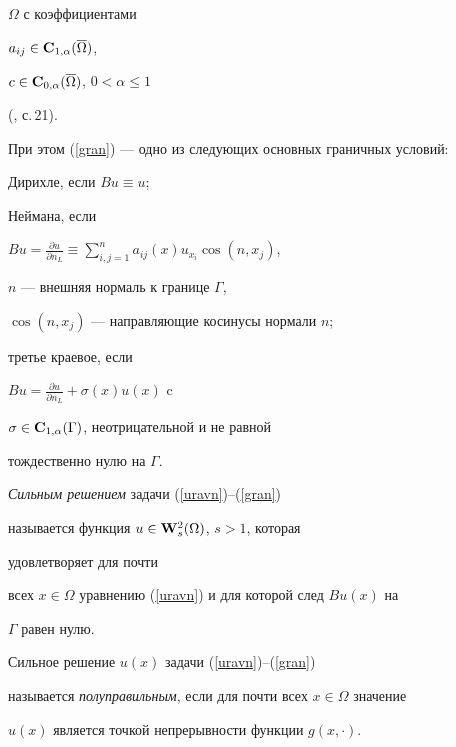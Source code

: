 $\Omega$ с коэффициентами


$a_{ij} \in {\bold C}_{1,\alpha}(\overline{\Omega})$,


$c \in {\bold C}_{0,\alpha}(\overline{\Omega})$, $0<\alpha\leq 1$


(\cite{lad}, с.\,21).


При этом (\ref{gran}) --- одно из следующих основных граничных условий:


Дирихле, если $Bu\equiv u$;


Неймана, если


$Bu=\frac{\partial u }{\partial n_L}\equiv \sum\limits_{i,j=1}^n


a_{ij}(x)u_{x_i}\cos(n,x_j)$,


$n$ --- внешняя нормаль к границе $\Gamma$,


$\cos(n,x_j)$ --- направляющие косинусы нормали $n$;


третье краевое, если


$Bu=\frac{\partial u }{\partial n_L}+\sigma (x)u(x)$ c


$\sigma \in{\bold C}_{1,\alpha}(\Gamma)$, неотрицательной и не равной


тождественно нулю на $\Gamma$.





\begin{defns}


{\it Сильным решением} задачи (\ref{uravn})--(\ref{gran})


называется функция $u \in{\bold W}_s^2(\Omega)$, $s{>}1$, которая


удовлетворяет для почти


всех $x\in\Omega$ уравнению (\ref{uravn}) и для которой след $Bu(x)$ на


$\Gamma$ равен нулю.


\end{defns}





\begin{defns}


Сильное решение $u(x)$ задачи (\ref{uravn})--(\ref{gran})


называется {\it полуправильным}, если для почти всех $x \in \Omega$ значение


$u(x)$ является точкой непрерывности функции $g(x, \cdot)$.


\end{defns}





